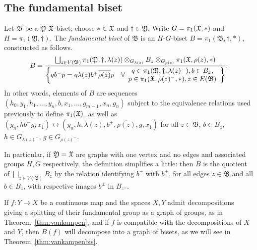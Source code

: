 \documentclass{amsart}
\begin{document}
\subsection{The fundamental biset}
\label{ss:FundBis}
\begin{defn}\label{defn:p1biset}
  Let $\mathfrak B$ be a $\mathfrak Y$-${\mathfrak X}$-biset; choose $*\in{\mathfrak X}$
  and $\dagger\in\mathfrak Y$. Write $G=\pi_1({\mathfrak X},*)$ and
  $H=\pi_1(\mathfrak Y,\dagger)$. The \emph{fundamental biset} of
  $\mathfrak B$ is an $H$-$G$-biset $B=\pi_1(\mathfrak B,\dagger,*)$,
  constructed as follows.
  \begin{equation}\label{eq:freebiset}
    B=\frac{\bigsqcup_{z\in V(\mathfrak B)}\pi_1(\mathfrak Y,\dagger,\lambda(z))\otimes_{G_{\lambda(z)}}B_z\otimes_{G_{\rho(z)}}\pi_1({\mathfrak X},\rho(z),*)}{\left\{q b^-p = q\lambda(z)b^+\overline{\rho(z)}p\quad\forall\begin{array}{c}q\in\pi_1(\mathfrak Y,\dagger,\lambda(z)^-),b\in B_z,\\p\in\pi_1({\mathfrak X},\rho(z)^-,*),z\in E(\mathfrak B)\end{array}\right\}}.
  \end{equation}
  In other words, elements of $B$ are sequences
  $(h_0,y_1,h_1,\dots,y_n,b,x_1,\dots,g_{m-1},x_n,g_n)$ subject to the
  equivalence relations used previously to define $\pi_1({\mathfrak X})$, as
  well as
  $(y_n,h b^-g,x_1)\leftrightarrow(y_n,h,\lambda(z),b^+,\overline{\rho(z)},g,x_1)$
  for all $z\in\mathfrak B$, $b\in B_z$, $h\in G_{\lambda(z)^-}$,
  $g\in G_{\rho(z)^-}$.
\end{defn}

In particular, if $\mathfrak Y={\mathfrak X}$ are graphs with one vertex and no edges
and associated groups $H,G$ respectively, the definition simplifies a
little: then $B$ is the quotient of $\bigsqcup_{z\in V(\mathfrak B)}B_z$ by
the relation identifying $b^-$ with $b^+$, for all edges $z\in\mathfrak B$
and all $b\in B_z$, with respective images $b^\pm$ in $B_{z^\pm}$.

If $f\colon Y\to X$ be a continuous map and the spaces $X,Y$ admit
decompositions giving a splitting of their fundamental group as a graph of
groups, as in Theorem~\ref{thm:vankampen}, and if $f$ is compatible with
the decompositions of $X$ and $Y$, then $B(f)$ will decompose into a graph
of bisets, as we will see in Theorem~\ref{thm:vankampenbis}.
\end{document}
